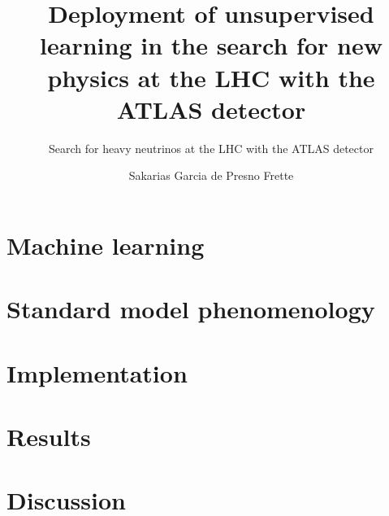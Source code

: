 \documentclass[UKenglish]{book}
\title{Deployment of unsupervised learning in the search for new physics at the LHC with the ATLAS detector}
\subtitle{Search for heavy neutrinos at the LHC with the ATLAS detector}
\author{Sakarias Garcia de Presno Frette}
\begin{document}
\duoforside[dept={Department of Physics}, program={Master's Program Name}, long]                                         

\frontmatter{}


\tableofcontents{}

\mainmatter{}






               

\chapter{Machine learning}\label{Chap:MLphenom}




\chapter{Standard model phenomenology}\label{Chap:SM}



\chapter{Implementation}\label{Chap:implementation}






\chapter{Results}\label{Chap:results}


\chapter{Discussion}\label{Chap:discussion}




\backmatter{}
\end{document}
